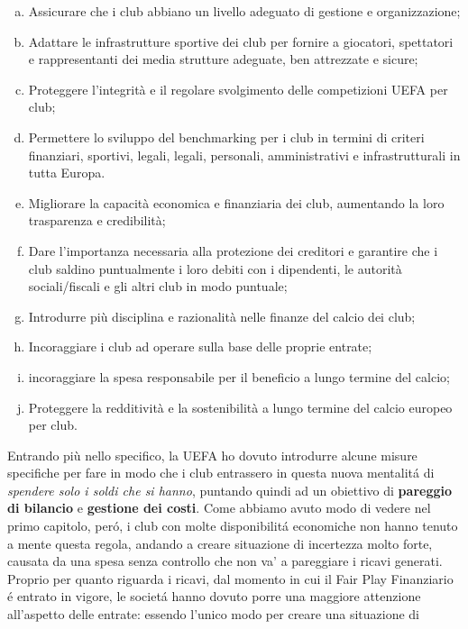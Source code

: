 \documentclass[
    corpo=12pt,
    oneside,
    evenboxes,
    tipotesi=triennale,
    stile=classica,
    oldstyle,
    autoretitolo,
    greek,
]{toptesi}
\begin{document}
\begin{interlinea}{1.5}
\begin{enumerate}[(a)]
    del calcio in Europa e a dare costante priorità alla formazione e alla cura dei
    giovani giocatori in ogni club; 
    \item Assicurare che i club abbiano un livello adeguato di gestione e organizzazione;
    \item Adattare le infrastrutture sportive dei club per fornire a giocatori, spettatori e rappresentanti dei media
    strutture adeguate, ben attrezzate e sicure;
    \item Proteggere l'integrità e il regolare svolgimento delle competizioni UEFA per club;
    \item Permettere lo sviluppo del benchmarking per i club in termini di criteri finanziari, sportivi, legali,
    legali, personali, amministrativi e infrastrutturali in tutta Europa.
    \item Migliorare la capacità economica e finanziaria dei club, aumentando la loro
    trasparenza e credibilità;
    \item Dare l'importanza necessaria alla protezione dei creditori e garantire
    che i club saldino puntualmente i loro debiti con i dipendenti, le autorità sociali/fiscali e gli altri
    club in modo puntuale;
    \item Introdurre più disciplina e razionalità nelle finanze del calcio dei club;
    \item Incoraggiare i club ad operare sulla base delle proprie entrate;
    \item incoraggiare la spesa responsabile per il beneficio a lungo termine del calcio;
    \item Proteggere la redditività e la sostenibilità a lungo termine del calcio europeo per club.
\end{enumerate}
Entrando più nello specifico, la UEFA ho dovuto introdurre alcune misure specifiche per fare in modo che i club entrassero in questa nuova 
mentalit\'a di \emph{spendere solo i soldi che si hanno}, puntando quindi ad un obiettivo di \textbf{pareggio di bilancio} e \textbf{
gestione dei costi}. Come abbiamo avuto modo di vedere nel primo capitolo, per\'o, i club con molte disponibilit\'a economiche non hanno
tenuto a mente questa regola, andando a creare situazione di incertezza molto forte, causata da una spesa senza controllo che non va' a 
pareggiare i ricavi generati. Proprio per quanto riguarda i ricavi, dal momento in cui il Fair Play Finanziario \'e entrato in vigore, le 
societ\'a hanno dovuto porre una maggiore attenzione all'aspetto delle entrate: essendo l'unico modo per creare una situazione di 

\end{interlinea}
\end{document}
